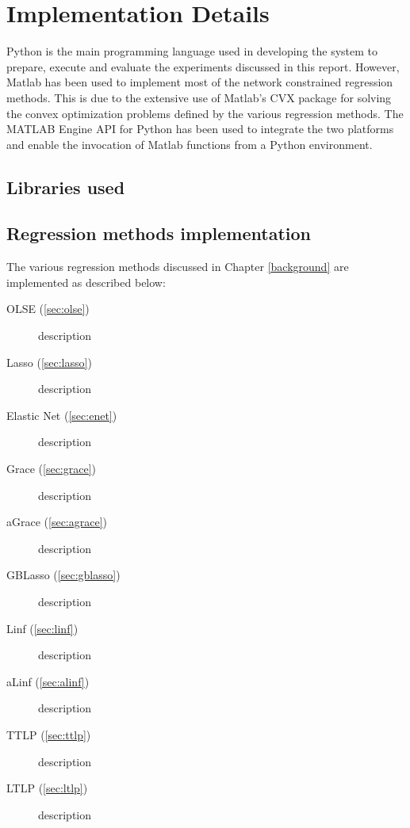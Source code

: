 \chapter{Implementation Details}
Python is the main programming language used in developing the system to prepare, execute and evaluate the experiments discussed in this report. However, Matlab has been used to implement most of the network constrained regression methods. This is due to the extensive use of Matlab's CVX package \cite{grant2014cvx}\cite{grant2008graph} for solving the convex optimization problems defined by the various regression methods. The MATLAB Engine API for Python has been used to integrate the two platforms and enable the invocation of Matlab functions from a Python environment.

\section{Libraries used}


\section{Regression methods implementation}
The various regression methods discussed in Chapter \ref{background} are implemented as described below:
\begin{description}
	\item[OLSE (\ref{sec:olse})] description
	\item[Lasso (\ref{sec:lasso})] description
	\item[Elastic Net (\ref{sec:enet})] description
	\item[Grace (\ref{sec:grace})] description
	\item[aGrace (\ref{sec:agrace})] description
	\item[GBLasso (\ref{sec:gblasso})] description
	\item[Linf (\ref{sec:linf})] description
	\item[aLinf (\ref{sec:alinf})] description
	\item[TTLP (\ref{sec:ttlp})] description
	\item[LTLP (\ref{sec:ltlp})] description
\end{description}